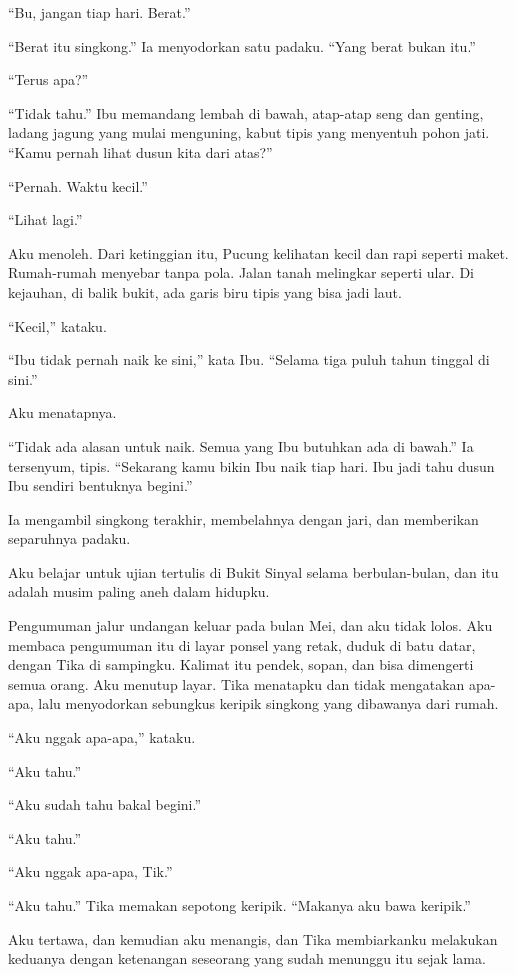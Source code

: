 \documentclass[11pt,twoside,openany]{book}
\makeatletter
\newcommand{\scenebreak}{\par\vspace{0.9em}{\centering\textsc{*\hspace{0.7em}*\hspace{0.7em}*}\par}\vspace{0.9em}\@afterindentfalse\@afterheading}
\makeatother
\begin{document}
``Bu, jangan tiap hari. Berat.''

``Berat itu singkong.'' Ia menyodorkan satu padaku. ``Yang berat bukan itu.''

``Terus apa?''

``Tidak tahu.'' Ibu memandang lembah di bawah, atap-atap seng dan genting, ladang jagung yang mulai menguning, kabut tipis yang menyentuh pohon jati. ``Kamu pernah lihat dusun kita dari atas?''

``Pernah. Waktu kecil.''

``Lihat lagi.''

Aku menoleh. Dari ketinggian itu, Pucung kelihatan kecil dan rapi seperti maket. Rumah-rumah menyebar tanpa pola. Jalan tanah melingkar seperti ular. Di kejauhan, di balik bukit, ada garis biru tipis yang bisa jadi laut.

``Kecil,'' kataku.

``Ibu tidak pernah naik ke sini,'' kata Ibu. ``Selama tiga puluh tahun tinggal di sini.''

Aku menatapnya.

``Tidak ada alasan untuk naik. Semua yang Ibu butuhkan ada di bawah.'' Ia tersenyum, tipis. ``Sekarang kamu bikin Ibu naik tiap hari. Ibu jadi tahu dusun Ibu sendiri bentuknya begini.''

Ia mengambil singkong terakhir, membelahnya dengan jari, dan memberikan separuhnya padaku.

\scenebreak
Aku belajar untuk ujian tertulis di Bukit Sinyal selama berbulan-bulan, dan itu adalah musim paling aneh dalam hidupku.

Pengumuman jalur undangan keluar pada bulan Mei, dan aku tidak lolos. Aku membaca pengumuman itu di layar ponsel yang retak, duduk di batu datar, dengan Tika di sampingku. Kalimat itu pendek, sopan, dan bisa dimengerti semua orang. Aku menutup layar. Tika menatapku dan tidak mengatakan apa-apa, lalu menyodorkan sebungkus keripik singkong yang dibawanya dari rumah.

``Aku nggak apa-apa,'' kataku.

``Aku tahu.''

``Aku sudah tahu bakal begini.''

``Aku tahu.''

``Aku nggak apa-apa, Tik.''

``Aku tahu.'' Tika memakan sepotong keripik. ``Makanya aku bawa keripik.''

Aku tertawa, dan kemudian aku menangis, dan Tika membiarkanku melakukan keduanya dengan ketenangan seseorang yang sudah menunggu itu sejak lama.
\end{document}

